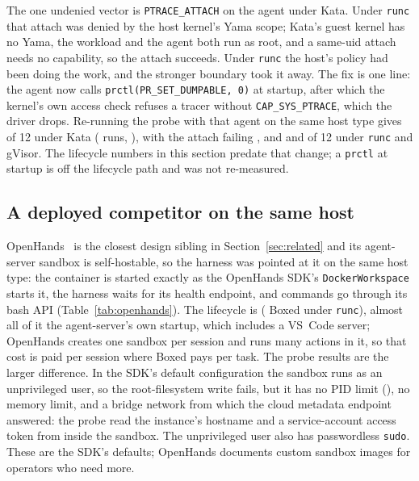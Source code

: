 \documentclass[conference]{IEEEtran}
\begin{document}
The one undenied vector is \texttt{PTRACE\_ATTACH} on the agent under
Kata. Under \texttt{runc} that attach was denied by the host kernel's Yama
scope; Kata's guest kernel has no Yama, the workload and the agent both run
as root, and a same-uid attach needs no capability, so the attach succeeds.
Under \texttt{runc} the host's policy had been doing the work, and the
stronger boundary took it away. The fix is one line: the agent now calls
\texttt{prctl(PR\_SET\_DUMPABLE, 0)} at startup, after which the kernel's
own access check refuses a tracer without \texttt{CAP\_SYS\_PTRACE},
which the driver drops. Re-running the probe with that agent on the same
host type gives \KataDeniedFixed{} of 12 under Kata
(\KataFixedRuns{} runs, \KataFixedConsistent), with the attach failing
\texttt{\KataPtraceFixedEvidence}, and \RuncDeniedFixed{} and
\RunscDeniedFixed{} of 12 under \texttt{runc} and gVisor. The lifecycle numbers in this section predate that change; a
\texttt{prctl} at startup is off the lifecycle path and was not
re-measured.

\subsection{A deployed competitor on the same host}\label{sec:openhands}
OpenHands~\cite{openhands} is the closest design sibling in
Section~\ref{sec:related} and its agent-server sandbox is self-hostable, so
the harness was pointed at it on the same host type: the container is
started exactly as the OpenHands SDK's \texttt{DockerWorkspace} starts it,
the harness waits for its health endpoint, and commands go through its bash
API (Table~\ref{tab:openhands}). The lifecycle is \OHMedian{}
(\OHVsBoxed{} Boxed under \texttt{runc}), almost all of it the
agent-server's own startup, which includes a VS~Code server; OpenHands
creates one sandbox per session and runs many actions in it, so that cost
is paid per session where Boxed pays per task. The probe results are the
larger difference. In the SDK's default configuration the sandbox runs as an
unprivileged user, so the root-filesystem write fails, but it has no PID
limit (\OHEvForkBomb), no memory limit, and a bridge network from
which the cloud metadata endpoint answered: the probe read the instance's
hostname and a service-account access token from inside the sandbox. The
unprivileged user also has passwordless \texttt{sudo}. These are the SDK's defaults; OpenHands documents custom sandbox images
for operators who need more.


\end{document}
